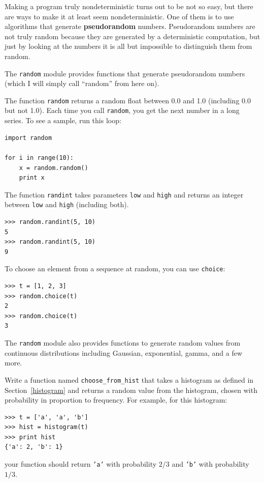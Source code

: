 \documentclass[10pt]{book}
\begin{document}
Making a program truly nondeterministic turns out to be not so easy,
but there are ways to make it at least seem nondeterministic.  One of
them is to use algorithms that generate {\bf pseudorandom} numbers.
Pseudorandom numbers are not truly random because they are generated
by a deterministic computation, but just by looking at the numbers it
is all but impossible to distinguish them from random.

The {\tt random} module provides functions that generate
pseudorandom numbers (which I will simply call ``random'' from
here on).

The function {\tt random} returns a random float
between 0.0 and 1.0 (including 0.0 but not 1.0).  Each time you
call {\tt random}, you get the next number in a long series.  To see a
sample, run this loop:

\begin{verbatim}
import random

for i in range(10):
    x = random.random()
    print x
\end{verbatim}
%
The function {\tt randint} takes parameters {\tt low} and
{\tt high} and returns an integer between {\tt low} and
{\tt high} (including both).

\begin{verbatim}
>>> random.randint(5, 10)
5
>>> random.randint(5, 10)
9
\end{verbatim}
%
To choose an element from a sequence at random, you can use
{\tt choice}:

\begin{verbatim}
>>> t = [1, 2, 3]
>>> random.choice(t)
2
>>> random.choice(t)
3
\end{verbatim}
%
The {\tt random} module also provides functions to generate
random values from continuous distributions including
Gaussian, exponential, gamma, and a few more.

\begin{exercise}

Write a function named \verb"choose_from_hist" that takes
a histogram as defined in Section~\ref{histogram} and returns a
random value from the histogram, chosen with probability
in proportion to frequency.  For example, for this histogram:

\begin{verbatim}
>>> t = ['a', 'a', 'b']
>>> hist = histogram(t)
>>> print hist
{'a': 2, 'b': 1}
\end{verbatim}
%
your function should return {\tt 'a'} with probability $2/3$ and {\tt 'b'}
with probability $1/3$.
\end{exercise}
\end{document}
